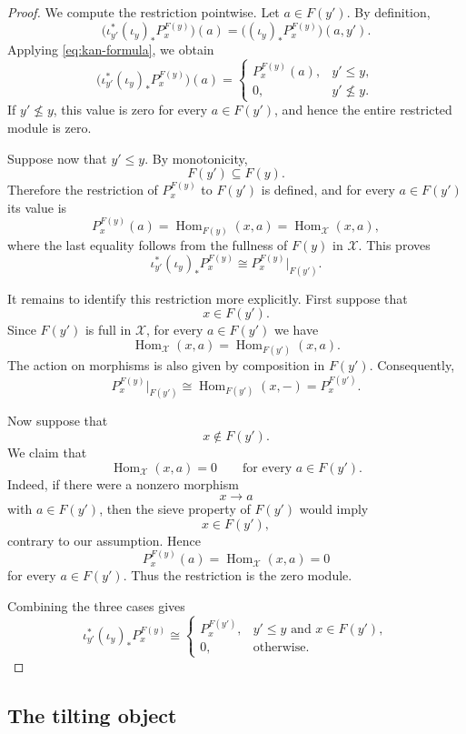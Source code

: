 \documentclass[12pt,a4paper,english,reqno]{amsart}
\theoremstyle{plain}
\theoremstyle{definition}
\newcommand{\Hom}{\operatorname{Hom}}
\newcommand{\X}{\mathcal X}
\begin{document}
\begin{proof}
We compute the restriction pointwise. Let $a\in F(y')$. By definition,
\[
\bigl(\iota_{y'}^*(\iota_y)_*P_x^{F(y)}\bigr)(a)
=
\bigl((\iota_y)_*P_x^{F(y)}\bigr)(a,y').
\]
Applying \eqref{eq:kan-formula}, we obtain
\[
\bigl(\iota_{y'}^*(\iota_y)_*P_x^{F(y)}\bigr)(a)
=
\begin{cases}
P_x^{F(y)}(a), & y'\leq y,\\
0,              & y'\nleq y.
\end{cases}
\]
If $y'\nleq y$, this value is zero for every $a\in F(y')$, and hence
the entire restricted module is zero.

Suppose now that $y'\leq y$. By monotonicity,
\[
F(y')\subseteq F(y).
\]
Therefore the restriction of $P_x^{F(y)}$ to $F(y')$ is defined, and
for every $a\in F(y')$ its value is
\[
P_x^{F(y)}(a)
=
\Hom_{F(y)}(x,a)
=
\Hom_{\X}(x,a),
\]
where the last equality follows from the fullness of $F(y)$ in $\X$.
This proves
\[
\iota_{y'}^*(\iota_y)_*P_x^{F(y)}
\cong
P_x^{F(y)}\vert_{F(y')}.
\]

It remains to identify this restriction more explicitly. First suppose
that
\[
x\in F(y').
\]
Since $F(y')$ is full in $\X$, for every $a\in F(y')$ we have
\[
\Hom_{\X}(x,a)
=
\Hom_{F(y')}(x,a).
\]
The action on morphisms is also given by composition in $F(y')$.
Consequently,
\[
P_x^{F(y)}\vert_{F(y')}
\cong
\Hom_{F(y')}(x,-)
=
P_x^{F(y')}.
\]

Now suppose that
\[
x\notin F(y').
\]
We claim that
\[
\Hom_{\X}(x,a)=0
\qquad
\text{for every }a\in F(y').
\]
Indeed, if there were a nonzero morphism
\[
x\longrightarrow a
\]
with $a\in F(y')$, then the sieve property of $F(y')$ would imply
\[
x\in F(y'),
\]
contrary to our assumption. Hence
\[
P_x^{F(y)}(a)=\Hom_{\X}(x,a)=0
\]
for every $a\in F(y')$. Thus the restriction is the zero module.

Combining the three cases gives
\[
\iota_{y'}^*(\iota_y)_*P_x^{F(y)}
\cong
\begin{cases}
P_x^{F(y')},
  & y'\leq y\text{ and }x\in F(y'),\\
0,
  & \text{otherwise}.
\end{cases}
\]
\end{proof}








\subsection{The tilting object}
\end{document}
